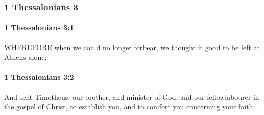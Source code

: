 	\subsubsection{1 Thessalonians 3} %
		\label{1THESSALONIANS-3}
		
		\paragraph{1 Thessalonians 3:1} %
			\label{1THESSALONIANS-3-1}

			WHEREFORE when we could no longer forbear, we thought it good to be left at Athens alone;

			\begin{framed}
			\scriptsize
				\begin{compactdesc}
					\item[SBLG] 
				\end{compactdesc}
			\end{framed}

		\paragraph{1 Thessalonians 3:2} %
			\label{1THESSALONIANS-3-2}

			And sent Timotheus, our brother, and minister of God, and our fellowlabourer in the gospel of Christ, to establish you, and to comfort you concerning your faith:

